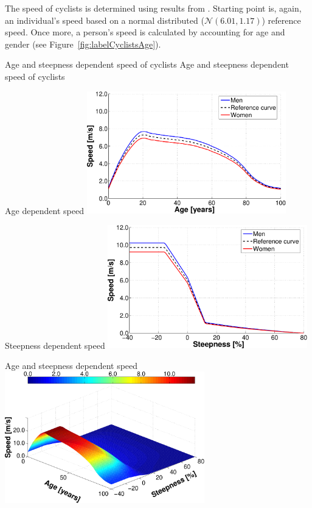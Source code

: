 The speed of cyclists is determined using results from \citet{ParkinRotheram_TPol_2010}. Starting point is, again, an individual's speed based on a normal distributed ($\mathcal{N}(6.01,1.17)$) reference speed. Once more, a person's speed is calculated by accounting for age and gender (see Figure~\ref{fig:labelCyclistsAge}).

\createfigure%
{Age and steepness dependent speed of cyclists}%
{Age and steepness dependent speed of cyclists}%
{\label{fig:labelBikeTravelTimes}}%
{%
  \createsubfigure%
  {Age dependent speed}%
  {\includegraphics[width=0.65\textwidth, angle=0]{extending/figures/MultiModalSimulation/cyclistsAge}}%
  {\label{fig:labelCyclistsAge}}%
  {\vspace{5mm}}%

  \createsubfigure%
  {Steepness dependent speed}%
  {\includegraphics[width=0.65\textwidth, angle=0]{extending/figures/MultiModalSimulation/cyclistsSteepness}}%
  {\label{fig:labelCyclistsSteepness}}%
  {\vspace{4mm}}%

  \createsubfigure%
  {Age and steepness dependent speed}%
  {\includegraphics[width=0.65\textwidth, angle=0]{extending/figures/MultiModalSimulation/cyclists3d}}%
  {\label{fig:labelCyclistsAgeSteepness3d}}%
  {}%
}%
{}
\afterpage{\clearpage}	%

